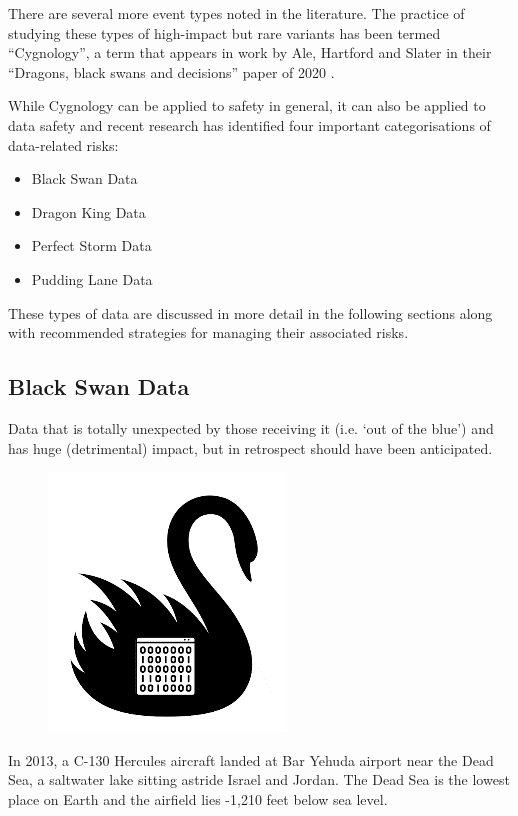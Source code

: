 There are several more event types noted in the literature.
The practice of studying these types of high-impact but rare variants has been termed “Cygnology”,
a term that appears in work by Ale, Hartford and Slater in their “Dragons,
black swans and decisions” paper of 2020 \cite{citation:cyg:dragons}.

While Cygnology can be applied to safety in general,
it can also be applied to data safety and recent research has identified four important
categorisations of data-related risks:
\begin{itemize}
\item Black Swan Data
\item Dragon King Data
\item Perfect Storm Data
\item Pudding Lane Data
\end{itemize}

These types of data are discussed in more detail in the following sections along with recommended strategies for managing their associated risks.

\subsection{Black Swan Data}
 Data that is totally unexpected by those receiving it (i.e. ‘out of the blue’) and has huge (detrimental) impact, but in retrospect should have been anticipated.

\begin{figure}
  \includegraphics{images/cygSwan}
\end{figure}

In 2013, a C-130 Hercules aircraft landed at Bar Yehuda airport near the Dead Sea, a saltwater lake sitting astride Israel and Jordan. The Dead Sea is the lowest place on Earth and the airfield lies -1,210 feet below sea level.

